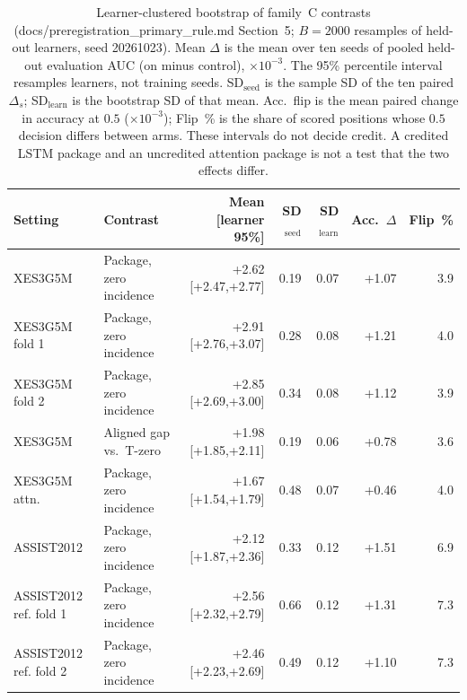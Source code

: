 \begin{table}[tbp]
\caption{Learner-clustered bootstrap of family~C contrasts
(docs/preregistration\_primary\_rule.md Section~5;
$B{=}2000$ resamples of held-out learners, seed 20261023).
Mean $\Delta$ is the mean over ten seeds of pooled held-out
evaluation AUC (on minus control), $\times 10^{-3}$. The 95\%
percentile interval resamples learners, not training seeds.
SD$_{\mathrm{seed}}$ is the sample SD of the ten paired
$\Delta_s$; SD$_{\mathrm{learn}}$ is the bootstrap SD of that
mean. Acc.\ flip is the mean paired change in accuracy at $0.5$
($\times 10^{-3}$); Flip~\% is the share of scored positions
whose $0.5$ decision differs between arms. These intervals do
not decide credit. A credited LSTM package and an uncredited
attention package is not a test that the two effects differ.}
\label{tab:learner-bootstrap}
\centering
\scriptsize
\setlength{\tabcolsep}{2.2pt}
\begin{tabular}{@{}llrrrrr@{}}
\toprule
Setting & Contrast & Mean [learner 95\%] & SD$_{\mathrm{seed}}$ & SD$_{\mathrm{learn}}$ & Acc.\ $\Delta$ & Flip~\% \\
\midrule
XES3G5M & Package, zero incidence & +2.62 [+2.47,+2.77] & 0.19 & 0.07 & +1.07 & 3.9 \\
XES3G5M fold 1 & Package, zero incidence & +2.91 [+2.76,+3.07] & 0.28 & 0.08 & +1.21 & 4.0 \\
XES3G5M fold 2 & Package, zero incidence & +2.85 [+2.69,+3.00] & 0.34 & 0.08 & +1.12 & 3.9 \\
XES3G5M & Aligned gap vs.\ T-zero & +1.98 [+1.85,+2.11] & 0.19 & 0.06 & +0.78 & 3.6 \\
XES3G5M attn. & Package, zero incidence & +1.67 [+1.54,+1.79] & 0.48 & 0.07 & +0.46 & 4.0 \\
ASSIST2012 & Package, zero incidence & +2.12 [+1.87,+2.36] & 0.33 & 0.12 & +1.51 & 6.9 \\
ASSIST2012 ref. fold 1 & Package, zero incidence & +2.56 [+2.32,+2.79] & 0.66 & 0.12 & +1.31 & 7.3 \\
ASSIST2012 ref. fold 2 & Package, zero incidence & +2.46 [+2.23,+2.69] & 0.49 & 0.12 & +1.10 & 7.3 \\
\bottomrule
\end{tabular}
\end{table}
